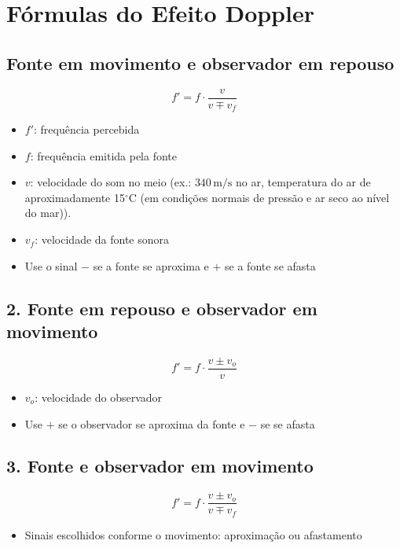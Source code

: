 \documentclass[a4paper,12pt]{article}
\begin{document}
\section{Fórmulas do Efeito Doppler}

\subsection{Fonte em movimento e observador em repouso}

\[
f' = f \cdot \frac{v}{v \mp v_f}
\]

\begin{itemize}
  \item \( f' \): frequência percebida
  \item \( f \): frequência emitida pela fonte
  \item \( v \): velocidade do som no meio (ex.: \(340 \, \text{m/s}\) no ar, temperatura do ar de aproximadamente 15$^{\circ}$C (em 
  condições normais de pressão e ar seco ao nível do mar)).
  \item \( v_f \): velocidade da fonte sonora
  \item Use o sinal \(-\) se a fonte se aproxima e \(+\) se a fonte se afasta
\end{itemize}

\subsection{2. Fonte em repouso e observador em movimento}

\[
f' = f \cdot \frac{v \pm v_o}{v}
\]

\begin{itemize}
  \item \( v_o \): velocidade do observador
  \item Use \(+\) se o observador se aproxima da fonte e \(-\) se se afasta
\end{itemize}

\subsection{3. Fonte e observador em movimento}

\[
f' = f \cdot \frac{v \pm v_o}{v \mp v_f}
\]

\begin{itemize}
  \item Sinais escolhidos conforme o movimento: aproximação ou afastamento
\end{itemize}
\end{document}
